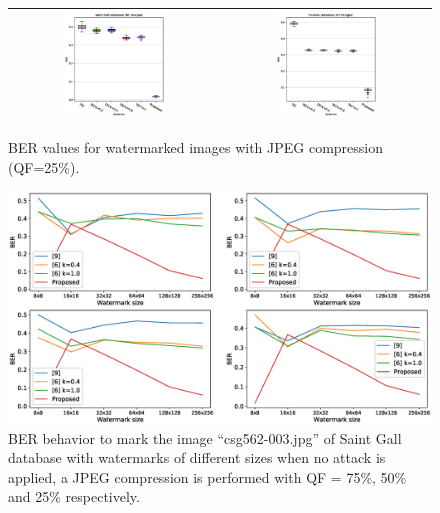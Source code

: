 \documentclass[runningheads]{llncs}
\begin{document}
\begin{figure}[H]
	\begin{center}
		\begin{tabular}{|c|c|}\hline
			\includegraphics[width=0.5\textwidth]{BER25SaintGall.eps}
			&\includegraphics[width=0.5\textwidth]{BER25Parzival.eps}\\\hline
		\end{tabular}
	\end{center}
	\caption{BER values for watermarked images with JPEG compression (QF=25\%).}
	\label{ber25}
\end{figure} 

\begin{figure}
	\begin{center}
		\includegraphics[width=1.1\textwidth]{BERwsizeSaintGall.eps}
		\caption{BER behavior to mark the image ``csg562-003.jpg'' of Saint Gall database with watermarks of different sizes when no attack is applied, a JPEG compression is performed with QF = 75\%, 50\% and 25\% respectively.} \label{berwsizeSaintGall}
	\end{center}
\end{figure}
\end{document}
